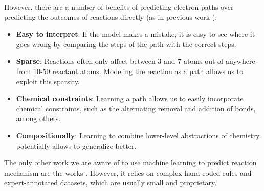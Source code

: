 However, there are a number of benefits of predicting electron paths over predicting the outcomes of reactions directly (as in previous work \cite{jin2017predicting,schwaller2017found}):
\begin{itemize}
\item \textbf{Easy to interpret}: If the model makes a mistake, it is easy to see where it goes wrong by comparing the steps of the path with the correct steps.
\item \textbf{Sparse}: Reactions often only affect between 3 and 7 atoms out of anywhere from 10-50 reactant atoms. Modeling the reaction as a path allows us to exploit this sparsity.
\item \textbf{Chemical constraints}: Learning a path allows us to easily incorporate chemical constraints, such as the alternating removal and addition of bonds, among others.
\item \textbf{Compositionally}: Learning to combine lower-level abstractions of chemistry potentially allows to generalize better.
\end{itemize}
The only other work we are aware of to use machine learning to predict reaction mechanism are the works \cite{kayala2011learning,kayala2012reactionpredictor}. However,
it relies on complex hand-coded rules and expert-annotated datasets, which are usually small and proprietary.

